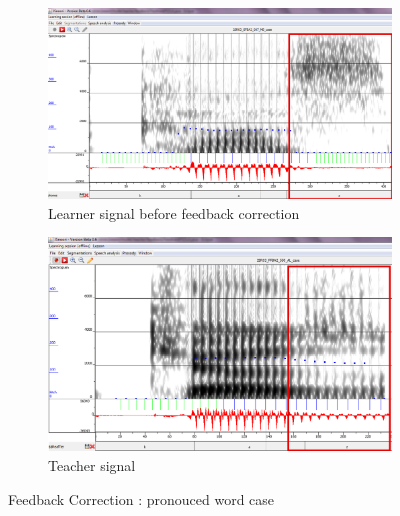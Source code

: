 \documentclass[11pt]{beamer}
\begin{document}
\begin{frame}

\begin{figure}
\begin{subfigure}{.5\textwidth}
  \centering
  \includegraphics[width=0.9\linewidth]{images/case_learner-changed.PNG}
  \caption{Learner signal before feedback correction}
  \label{fig:sfig1}
\end{subfigure}%
\begin{subfigure}{.5\textwidth}
  \centering
  \includegraphics[width=0.9\linewidth]{images/teacher_case_Changed.PNG}
  \caption{Teacher signal}
  \label{fig:sfig2}
\end{subfigure}
\caption{Feedback Correction : pronouced word case}
\label{fig:fig}
\end{figure}
\end{frame}
\end{document}
